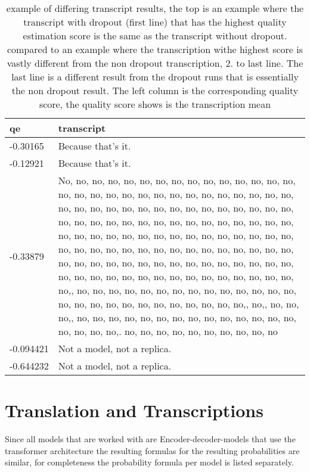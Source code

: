 \begin{table}[ht]
    \centering
    \begin{tabularx}{\textwidth}{l|X}
         qe& transcript \\\hline
         -0.30165& Because that's it. \\
         -0.12921& Because that's it.\\\hline
         -0.33879& No, no, no, no, no, no, no, no, no, no, no, no, no, no, no, no, no, no, no, no, no, no, no, no, no, no, no, no, no, no, no, no, no, no, no, no, no, no, no, no, no, no, no, no, no, no, no, no, no, no, no, no, no, no, no, no, no, no, no, no, no, no, no, no, no, no, no, no, no, no, no, no, no, no, no, no, no, no, no, no, no, no, no, no, no, no, no, no, no, no, no, no, no, no, no, no, no, no, no, no, no, no, no, no, no, no, no, no, no, no, no, no, no, no, no, no, no, no, no, no, no,, no, no, no, no, no, no, no, no, no, no, no, no, no, no, no, no, no, no, no, no, no, no, no, no, no, no,, no,, no, no, no,, no, no, no, no, no, no, no, no, no, no, no, no, no, no, no, no, no, no,. no, no, no, no, no, no, no, no, no, no\\
         -0.094421 &Not a model, not a replica.\\
         -0.644232&  Not a model, not a replica.
    \end{tabularx}
    \caption{example of differing transcript results, the top is an example where the transcript with dropout (first line) that has the highest quality estimation score is the same as the transcript without dropout. compared to an example where the transcription withe highest score is vastly different from the non dropout transcription, 2. to last line. The last line is a different result from the dropout runs that is essentially the non dropout result. The left column is the corresponding quality score, the quality score shows is the transcription mean}
    \label{tab:transcriptshift}
\end{table}




\section{Translation and Transcriptions}
Since all models that are worked with are Encoder-decoder-models that use the transformer architecture the resulting formulas for the resulting probabilities are similar, for completeness the probability formula per model is listed separately. 


